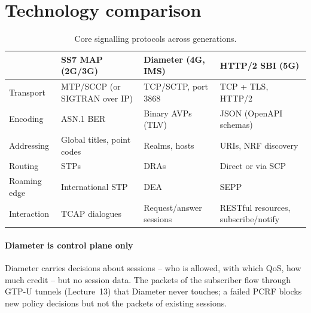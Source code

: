 \documentclass[11pt,a4paper]{article}
\begin{document}
\section{Technology comparison}
\begin{table}[htbp]
\centering\small
\caption{Core signalling protocols across generations.}\label{tab:sig}
\begin{tabularx}{\linewidth}{@{}l Y Y Y@{}}
\toprule
{} & SS7 MAP (2G/3G) & Diameter (4G, IMS) & HTTP/2 SBI (5G) \\
\midrule
Transport    & MTP/SCCP (or SIGTRAN over IP) & TCP/SCTP, port 3868 & TCP + TLS, HTTP/2 \\
Encoding     & ASN.1 BER                     & Binary AVPs (TLV)   & JSON (OpenAPI schemas) \\
Addressing   & Global titles, point codes    & Realms, hosts       & URIs, NRF discovery \\
Routing      & STPs                          & DRAs                & Direct or via SCP \\
Roaming edge & International STP             & DEA                 & SEPP \\
Interaction  & TCAP dialogues                & Request/answer sessions & RESTful resources, subscribe/notify \\
\bottomrule
\end{tabularx}
\end{table}

\paragraph{Diameter is control plane only} Diameter carries decisions about sessions -- who is allowed, with
which QoS, how much credit -- but no session data. The packets of the subscriber flow through GTP-U
tunnels (Lecture~13) that Diameter never touches; a failed PCRF blocks new policy decisions but not the
packets of existing sessions.

\end{document}
